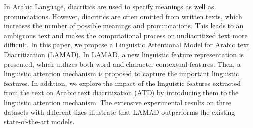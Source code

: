 In Arabic Language, diacritics are used to specify meanings as well as pronunciations. However, diacritics are often omitted from written texts, which increases the number of possible meanings and pronunciations. This leads to an ambiguous text and makes the computational process on undiacritized text more difficult. In this paper, we propose a Linguistic Attentional Model for Arabic text Diacritization (LAMAD). In LAMAD, a new linguistic feature representation is presented, which utilizes both word and character contextual features. Then, a linguistic attention mechanism is proposed to capture the important linguistic features. In addition, we explore the impact of the linguistic features extracted from the text on Arabic text diacritization (ATD) by introducing them to the linguistic attention mechanism. The extensive experimental results on three datasets with different sizes illustrate that LAMAD outperforms the existing state-of-the-art models.
